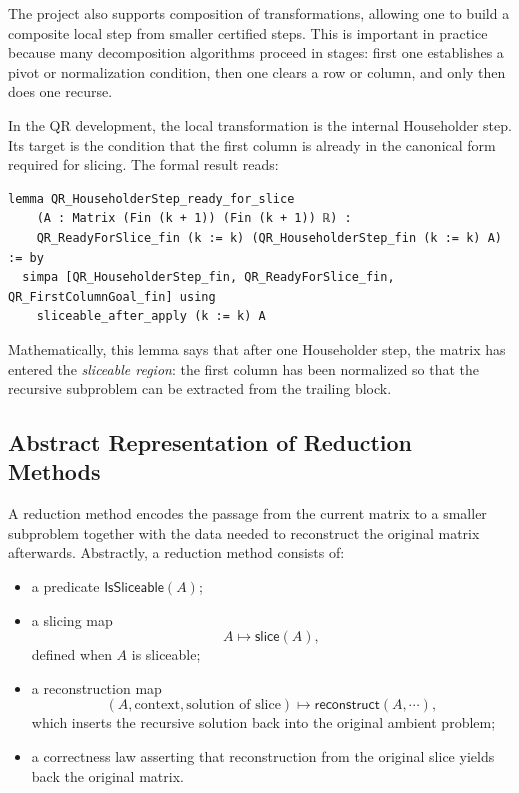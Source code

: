 \documentclass[pdflatex,sn-mathphys-num]{sn-jnl}%
\theoremstyle{thmstyleone}%
\theoremstyle{thmstyletwo}%
\theoremstyle{thmstylethree}%
\begin{document}
The project also supports composition of transformations, allowing one to build a composite local step from smaller certified steps.  This is important in practice because many decomposition algorithms proceed in stages: first one establishes a pivot or normalization condition, then one clears a row or column, and only then does one recurse.

In the QR development, the local transformation is the internal Householder step.  Its target is the condition that the first column is already in the canonical form required for slicing.  The formal result reads:

\begin{lstlisting}
lemma QR_HouseholderStep_ready_for_slice
    (A : Matrix (Fin (k + 1)) (Fin (k + 1)) ℝ) :
    QR_ReadyForSlice_fin (k := k) (QR_HouseholderStep_fin (k := k) A) := by
  simpa [QR_HouseholderStep_fin, QR_ReadyForSlice_fin, QR_FirstColumnGoal_fin] using
    sliceable_after_apply (k := k) A
\end{lstlisting}

Mathematically, this lemma says that after one Householder step, the matrix has entered the \emph{sliceable region}: the first column has been normalized so that the recursive subproblem can be extracted from the trailing block.

\subsection{Abstract Representation of Reduction Methods}

A reduction method encodes the passage from the current matrix to a smaller subproblem together with the data needed to reconstruct the original matrix afterwards.  Abstractly, a reduction method consists of:

\begin{itemize}
\item a predicate \(\mathsf{IsSliceable}(A)\);
\item a slicing map
\[
A \mapsto \mathsf{slice}(A),
\]
defined when \(A\) is sliceable;
\item a reconstruction map
\[
(A,\text{context},\text{solution of slice}) \mapsto \mathsf{reconstruct}(A,\cdots),
\]
which inserts the recursive solution back into the original ambient problem;
\item a correctness law asserting that reconstruction from the original slice yields back the original matrix.
\end{itemize}
\end{document}
